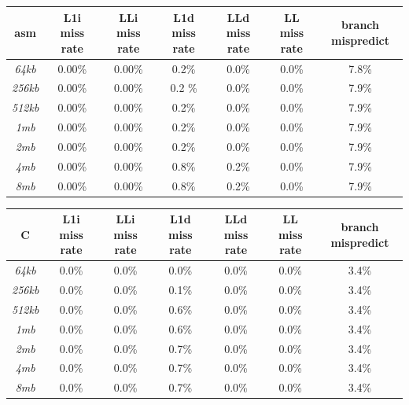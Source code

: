 \documentclass[a4paper]{article}
\begin{document}
\begin{center}
	\begin{tabular}[c]{|c|c|c|c|c|c|c|}
    \hline
        \textbf{asm} &  \textbf{L1i miss rate} & \textbf{LLi miss rate} & \textbf{L1d miss rate} & \textbf{LLd miss rate} & \textbf{LL miss rate} & \textbf{branch mispredict}\\
        \hline
\textit{64kb} &   0.00\%    & 0.00\% & 0.2\% & 0.0\% & 0.0\% & 7.8\% \\
        \hline
\textit{256kb} &   0.00\%    & 0.00\% & 0.2 \% & 0.0\% & 0.0\% & 7.9\% \\
        \hline
\textit{512kb} & 0.00\%    & 0.00\% & 0.2\% & 0.0\% & 0.0\% & 7.9\% \\
        \hline
\textit{1mb} &   0.00\%    & 0.00\% & 0.2\% & 0.0\% & 0.0\% & 7.9\% \\
        \hline
\textit{2mb} &  0.00\%    & 0.00\% & 0.2\% & 0.0\% & 0.0\% & 7.9\% \\
        \hline
\textit{4mb} & 0.00\%    & 0.00\% & 0.8\% & 0.2\% & 0.0\% & 7.9\% \\
        \hline
\textit{8mb} & 0.00\%    & 0.00\% & 0.8\% & 0.2\% & 0.0\% & 7.9\% \\
        \hline
    \end{tabular}
    
    
    	\begin{tabular}[c]{|c|c|c|c|c|c|c|}
    \hline
        \textbf{C} &  \textbf{L1i miss rate} & \textbf{LLi miss rate} & \textbf{L1d miss rate} & \textbf{LLd miss rate} & \textbf{LL miss rate} & \textbf{branch mispredict}\\
        \hline
\textit{64kb} &    0.0\%  & 0.0\% & 0.0\% & 0.0\% & 0.0\% & 3.4\% \\
        \hline
\textit{256kb} &   0.0\%  & 0.0\% & 0.1\% & 0.0\% & 0.0\% & 3.4\%\\
        \hline
\textit{512kb} &  0.0\%  & 0.0\% & 0.6\% & 0.0\% & 0.0\% & 3.4\% \\
        \hline
\textit{1mb} &  0.0\%  & 0.0\% & 0.6\% & 0.0\% & 0.0\% & 3.4\% \\
        \hline
\textit{2mb} &   0.0\%  & 0.0\% & 0.7\% & 0.0\% & 0.0\% & 3.4\% \\
        \hline
\textit{4mb} &  0.0\%  & 0.0\% & 0.7\% & 0.0\% & 0.0\% & 3.4\% \\
        \hline
\textit{8mb} &   0.0\%  & 0.0\% & 0.7\% & 0.0\% & 0.0\% & 3.4\% \\
        \hline
    \end{tabular}
\end{center}
\end{document}
